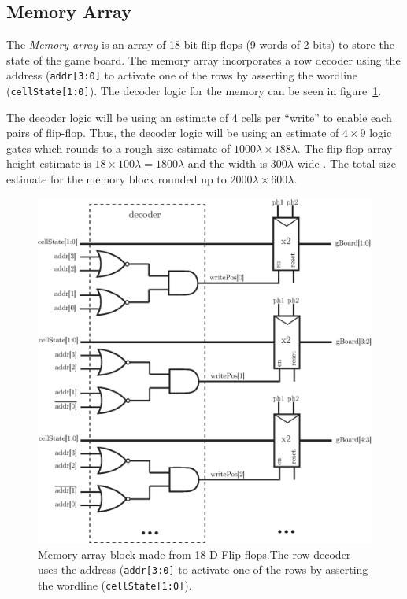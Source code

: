 \documentclass[]{article}
\begin{document}
\subsection{Memory Array}
The \emph{Memory array} is an array of 18-bit flip-flops (9 words of 2-bits) to store the state of the game board. The memory array incorporates a row decoder using the address (\texttt{addr[3:0]} to activate one of the rows by asserting the wordline (\texttt{cellState[1:0]}). The decoder logic for the memory can be seen in figure~\ref{fig:memArray}.

The decoder logic will be using an estimate of 4 cells per ``write'' to enable each pairs of flip-flop. Thus, the decoder logic will be using an estimate of $4\times 9$ logic gates which rounds to a rough size estimate of  $ 1000\lambda \times 188 \lambda$. The flip-flop array height estimate is $18 \times 100\lambda = 1800\lambda$ and the width is $300\lambda$ wide . The total size estimate for the memory block rounded up to $2000 \lambda \times 600 \lambda$.
\begin{figure}
\centering
\includegraphics[width=.45\textwidth]{memArray}
\caption{Memory array block made from 18 D-Flip-flops.The row decoder uses the address (\texttt{addr[3:0]} to activate one of the rows by asserting the wordline (\texttt{cellState[1:0]}). }
\label{fig:memArray}
\end{figure}
\end{document}
